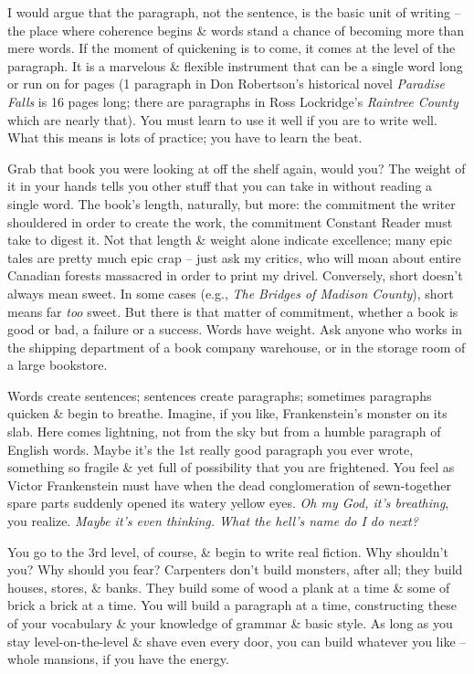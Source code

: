 \documentclass{article}
\numberwithin{equation}{section}
\begin{document}
I would argue that the paragraph, not the sentence, is the basic unit of writing -- the place where coherence begins \& words stand a chance of becoming more than mere words. If the moment of quickening is to come, it comes at the level of the paragraph. It is a marvelous \& flexible instrument that can be a single word long or run on for pages (1 paragraph in Don Robertson's historical novel \textit{Paradise Falls} is 16 pages long; there are paragraphs in Ross Lockridge's \textit{Raintree County} which are nearly that). You must learn to use it well if you are to write well. What this means is lots of practice; you have to learn the beat.

 Grab that book you were looking at off the shelf again, would you? The weight of it in your hands tells you other stuff that you can take in without reading a single word. The book's length, naturally, but more: the commitment the writer shouldered in order to create the work, the commitment Constant Reader must take to digest it. Not that length \& weight alone indicate excellence; many epic tales are pretty much epic crap -- just ask my critics, who will moan about entire Canadian forests massacred in order to print my drivel. Conversely, short doesn't always mean sweet. In some cases (e.g., \textit{The Bridges of Madison County}), short means far \textit{too} sweet. But there is that matter of commitment, whether a book is good or bad, a failure or a success. Words have weight. Ask anyone who works in the shipping department of a book company warehouse, or in the storage room of a large bookstore.

Words create sentences; sentences create paragraphs; sometimes paragraphs quicken \& begin to breathe. Imagine, if you like, Frankenstein's monster on its slab. Here comes lightning, not from the sky but from a humble paragraph of English words. Maybe it's the 1st really good paragraph you ever wrote, something so fragile \& yet full of possibility that you are frightened. You feel as Victor Frankenstein must have when the dead conglomeration of sewn-together spare parts suddenly opened its watery yellow eyes. \textit{Oh my God, it's breathing}, you realize. \textit{Maybe it's even thinking. What the hell's name do I do next?}

You go to the 3rd level, of course, \& begin to write real fiction. Why shouldn't you? Why should you fear? Carpenters don't build monsters, after all; they build houses, stores, \& banks. They build some of wood a plank at a time \& some of brick a brick at a time. You will build a paragraph at a time, constructing these of your vocabulary \& your knowledge of grammar \& basic style. As long as you stay level-on-the-level \& shave even every door, you can build whatever you like -- whole mansions, if you have the energy.
\end{document}
